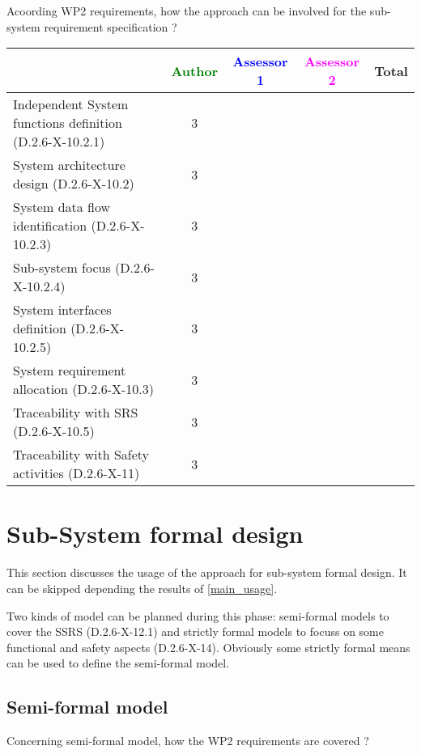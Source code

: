 Acoording WP2 requirements, how the approach can be involved for the sub-system requirement specification ?

\begin{tabular}{|l | c | c | c | c|}
\hline
& \textcolor{green}{Author} & \textcolor{blue}{Assessor 1} & \textcolor{magenta}{Assessor 2} & Total \\
\hline
Independent System functions definition (D.2.6-X-10.2.1)  & 3 & & &  \\
\hline 
System architecture design (D.2.6-X-10.2) & 3 & & &  \\
\hline
System data flow identification (D.2.6-X-10.2.3)  & 3 & & &  \\
\hline
Sub-system focus (D.2.6-X-10.2.4)  & 3 & & &  \\
\hline
System interfaces definition (D.2.6-X-10.2.5)  & 3 & & &  \\
\hline
System requirement allocation (D.2.6-X-10.3)  & 3 & & &  \\
\hline
Traceability with SRS (D.2.6-X-10.5)  & 3 & & &  \\
\hline
Traceability with Safety activities (D.2.6-X-11)  & 3 & & &  \\
\hline
\end{tabular}



\section{Sub-System formal design}
This section discusses the usage of the approach for sub-system formal design.
It can be skipped depending the results of \ref{main_usage}.

Two kinds of model can be planned during this phase: semi-formal models to  cover the SSRS (D.2.6-X-12.1) and strictly formal  models to  focuss on some functional and safety aspects (D.2.6-X-14).  Obviously some strictly  formal means can be used to define the semi-formal  model.

\subsection{Semi-formal model}

Concerning semi-formal model, how the WP2 requirements are covered ?

